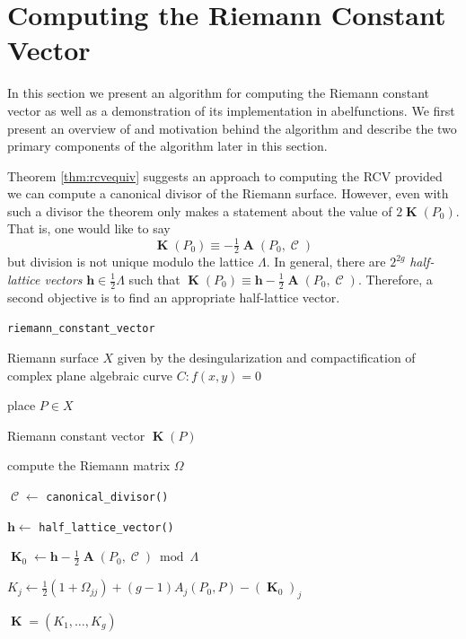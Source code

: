 \documentclass[12pt]{article}
\theoremstyle{definition}
\DeclareMathOperator{\DivC}{\mathcal{C}}
\DeclareMathOperator{\RCV}{\boldsymbol{K}}
\DeclareMathOperator{\Abel}{\boldsymbol{A}}
\begin{document}
\section{Computing the Riemann Constant Vector}





In this section we present an algorithm for computing the Riemann
constant vector as well as a demonstration of its implementation in {\sc
  abelfunctions}. We first present an overview of and motivation behind
the algorithm and describe the two primary components of the algorithm
later in this section.

Theorem \ref{thm:rcvequiv} suggests an approach to computing the RCV
provided we can compute a canonical divisor of the Riemann
surface. However, even with such a divisor the theorem only makes a
statement about the value of $2\RCV(P_0)$. That is, one would like to
say
\begin{equation}
\RCV(P_0) \equiv - \tfrac{1}{2} \Abel(P_0,\DivC)
\end{equation}
but division is not unique modulo the lattice $\Lambda$. In general,
there are $2^{2g}$ {\it half-lattice vectors} $\boldsymbol{h} \in
\tfrac{1}{2}\Lambda$ such that $\RCV(P_0) \equiv \boldsymbol{h} -
\tfrac{1}{2}\Abel(P_0,\DivC)$. Therefore, a second objective is to find
an appropriate half-lattice vector.

\begin{algorithm}[H]
\caption{\tt riemann\_constant\_vector}
\label{alg:rcv}
\begin{algorithmic}[1]
  \Require Riemann surface $X$ given by the desingularization and
  compactification of complex plane algebraic curve $C : f(x,y) = 0$

  \Require place $P \in X$

  \Ensure Riemann constant vector $\RCV(P)$

  \State compute the Riemann matrix $\Omega$

  \State $\DivC \gets$ \verb=canonical_divisor()=

  \State $\boldsymbol{h} \gets$ \verb=half_lattice_vector()=

  \State $\RCV_0 \gets \boldsymbol{h} - \tfrac{1}{2}\Abel(P_0,\DivC)
  \bmod{\Lambda}$


      \State $K_j \gets \tfrac{1}{2}(1+\Omega_{jj}) + (g-1)A_j(P_0,P) -
      (\RCV_0)_j$

  \EndFor

  \State \Return $\RCV = (K_1, \ldots, K_g)$
\end{algorithmic}
\end{algorithm}
\end{document}
